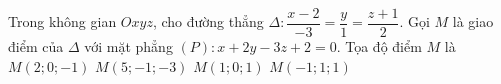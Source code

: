 \begin{ex}%
	Trong không gian $Oxyz$, cho đường thẳng $\Delta \colon \dfrac{x-2}{-3}=\dfrac{y}{1}=\dfrac{z+1}{2}$. Gọi $M$ là giao điểm của $\Delta $ với mặt phẳng $(P)\colon x+2y-3z+2=0$. Tọa độ điểm $M$ là
	\choice
	{$M(2;0;-1)$}
	{$M(5;-1;-3)$}
	{$M(1;0;1)$}
	{\True $M(-1;1;1)$}
		\end{ex}

